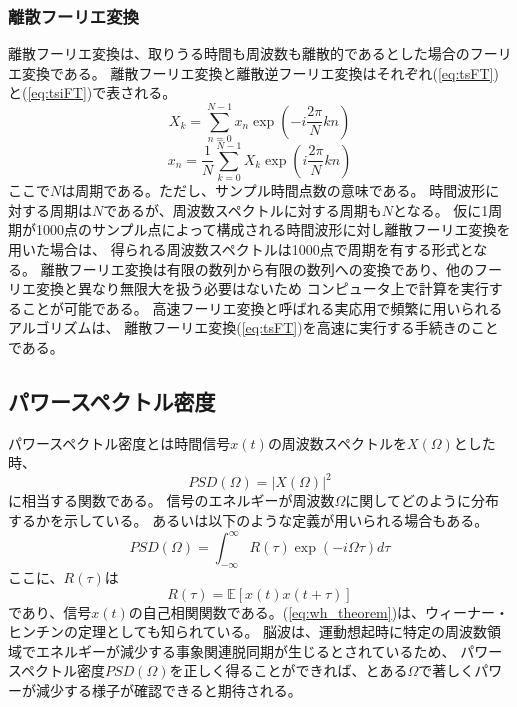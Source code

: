\subsubsection{離散フーリエ変換}
離散フーリエ変換は、取りうる時間も周波数も離散的であるとした場合のフーリエ変換である。
離散フーリエ変換と離散逆フーリエ変換はそれぞれ(\ref{eq:tsFT})と(\ref{eq:tsiFT})で表される。
\begin{equation}
    X_k=\sum_{n = 0}^{N-1} x_n \exp \left(-i\frac{2\pi}{N} k n \right)
    \label{eq:tsFT}
\end{equation}
\begin{equation}
    x_n=\frac{1}{N}\sum_{k=0}^{N-1} X_k \exp \left(i \frac{2\pi}{N} k n \right)
    \label{eq:tsiFT}
\end{equation}
ここで\(N\)は周期である。ただし、サンプル時間点数の意味である。
時間波形に対する周期は\(N\)であるが、周波数スペクトルに対する周期も\(N\)となる。
仮に1周期が1000点のサンプル点によって構成される時間波形に対し離散フーリエ変換を用いた場合は、
得られる周波数スペクトルは1000点で周期を有する形式となる。
離散フーリエ変換は有限の数列から有限の数列への変換であり、他のフーリエ変換と異なり無限大を扱う必要はないため
コンピュータ上で計算を実行することが可能である。
高速フーリエ変換と呼ばれる実応用で頻繁に用いられるアルゴリズムは、
離散フーリエ変換(\ref{eq:tsFT})を高速に実行する手続きのことである。

\subsection{パワースペクトル密度}
パワースペクトル密度とは時間信号\(x(t)\)の周波数スペクトルを\(X(\Omega)\)とした時、
\begin{equation}
    PSD(\Omega)=|X(\Omega)|^2
\end{equation}
に相当する関数である。
信号のエネルギーが周波数\(\Omega\)に関してどのように分布するかを示している。
あるいは以下のような定義が用いられる場合もある。
\begin{equation}
    PSD(\Omega) = \int_{-\infty}^{\infty} R(\tau)\exp(-i\Omega \tau)d\tau
    \label{eq:wh_theorem}
\end{equation}
ここに、\(R(\tau)\)は
\begin{equation}
    R(\tau)  =  \mathbb E[x(t)x(t+\tau)]    
\end{equation}
であり、信号\(x(t)\)の自己相関関数である。(\ref{eq:wh_theorem})は、ウィーナー・ヒンチンの定理としても知られている。
脳波は、運動想起時に特定の周波数領域でエネルギーが減少する事象関連脱同期が生じるとされているため、
パワースペクトル密度\(PSD(\Omega)\)を正しく得ることができれば、とある\(\Omega\)で著しくパワーが減少する様子が確認できると期待される。

